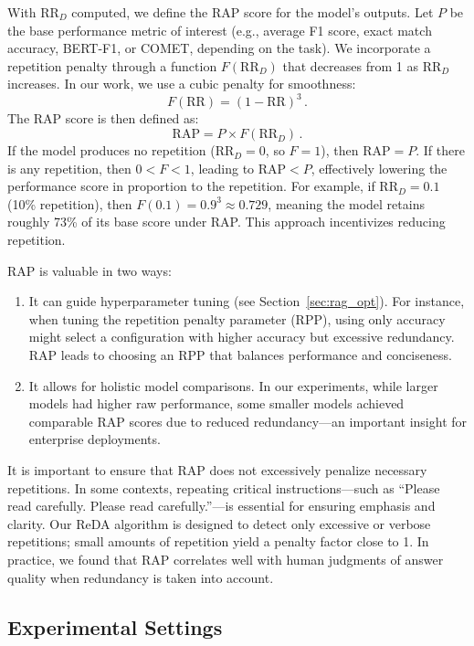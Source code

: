 With $\text{RR}_D$ computed, we define the RAP score for the model's outputs. Let $P$ be the base performance metric of interest (e.g., average F1 score, exact match accuracy, BERT-F1, or COMET, depending on the task). We incorporate a repetition penalty through a function $F(\text{RR}_D)$ that decreases from 1 as $\text{RR}_D$ increases. In our work, we use a cubic penalty for smoothness:
\[
F(\text{RR}) = (1 - \text{RR})^3\,.
\]
The RAP score is then defined as:
\begin{equation}
\text{RAP} = P \times F(\text{RR}_D)\,.\label{eq:rap}
\end{equation}
If the model produces no repetition ($\text{RR}_D = 0$, so $F=1$), then $\text{RAP} = P$. If there is any repetition, then $0 < F < 1$, leading to $\text{RAP} < P$, effectively lowering the performance score in proportion to the repetition. For example, if $\text{RR}_D = 0.1$ (10\% repetition), then $F(0.1) = 0.9^3 \approx 0.729$, meaning the model retains roughly 73\% of its base score under RAP. This approach incentivizes reducing repetition.

RAP is valuable in two ways:
\begin{enumerate}[leftmargin=*]
    \item It can guide hyperparameter tuning (see Section~\ref{sec:rag_opt}). For instance, when tuning the repetition penalty parameter (RPP), using only accuracy might select a configuration with higher accuracy but excessive redundancy. RAP leads to choosing an RPP that balances performance and conciseness.
    \item It allows for holistic model comparisons. In our experiments, while larger models had higher raw performance, some smaller models achieved comparable RAP scores due to reduced redundancy---an important insight for enterprise deployments.
\end{enumerate}

It is important to ensure that RAP does not excessively penalize necessary repetitions. In some contexts, repeating critical instructions---such as ``Please read carefully. Please read carefully.''---is essential for ensuring emphasis and clarity. Our ReDA algorithm is designed to detect only excessive or verbose repetitions; small amounts of repetition yield a penalty factor close to 1. In practice, we found that RAP correlates well with human judgments of answer quality when redundancy is taken into account.

\subsection{Experimental Settings}
\label{sec:rap_experiments}

